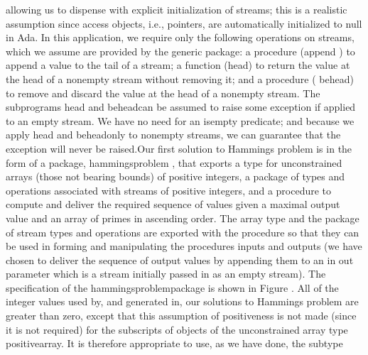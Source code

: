 allowing us to dispense with explicit initialization of streams; this
is a realistic assumption since access objects, i.e., pointers, are
automatically initialized to \tyxffmxmono[]\tyxtstxbf[]null%
\tyxtstxendbf[]\tyxffmxendmono[] in Ada. In this application, we require
only the following operations on streams, which we assume are provided
by the generic package: a procedure (\tyxffmxmono[]append%
\tyxffmxendmono[]) to append a value to the tail of a stream; a function
(\tyxffmxmono[]head\tyxffmxendmono[]) to return the value at the head
of a nonempty stream without removing it; and a procedure (%
\tyxffmxmono[]behead\tyxffmxendmono[]) to remove and discard the value
at the head of a nonempty stream. The subprograms \tyxffmxmono[]head%
\tyxffmxendmono[] and \tyxffmxmono[]behead\tyxffmxendmono[] can be
assumed to raise some exception if applied to an empty stream. We
have no need for an \tyxffmxmono[]is\Symuns[]empty%
\tyxffmxendmono[] predicate; and because we apply \tyxffmxmono[]head%
\tyxffmxendmono[] and \tyxffmxmono[]behead\tyxffmxendmono[] only to
nonempty streams, we can guarantee that the exception will never be
raised.\Endpara[]
\Para[]Our first solution to Hamming\rsquo[]s problem is in the form
of a package, \tyxffmxmono[]hammings\Symuns[]problem%
\tyxffmxendmono[], that exports a type for unconstrained arrays (those
not bearing bounds) of positive integers, a package of types and operations
associated with streams of positive integers, and a procedure to compute
and deliver the required sequence of values given a maximal output
value and an array of primes in ascending order. The array type and
the package of stream types and operations are exported with the procedure
so that they can be used in forming and manipulating the procedure\rsquo[]s
inputs and outputs (we have chosen to deliver the sequence of output
values by appending them to an \tyxffmxmono[]\tyxtstxbf[]in%
\tyxtstxendbf[]\tyxffmxendmono[] \tyxffmxmono[]\tyxtstxbf[]out%
\tyxtstxendbf[]\tyxffmxendmono[] parameter which is a stream initially
passed in as an empty stream). The specification of the %
\tyxffmxmono[]hammings\Symuns[]problem\tyxffmxendmono[] package is
shown in Figure .%
\NtFoot[]\NtNtpar[]All of the integer values used by, and generated
in, our solutions to Hamming\rsquo[]s problem are greater than zero,
except that this assumption of positiveness is not made (since it
is not required) for the subscripts of objects of the unconstrained
array type \tyxffmxmono[]positive\Symuns[]array\tyxffmxendmono[].
It is therefore appropriate to use, as we have done, the subtype %
